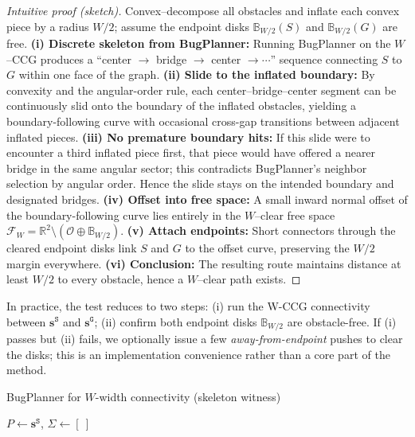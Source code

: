 \begin{proof}[Intuitive proof (sketch)]
Convex–decompose all obstacles and inflate each convex piece by a radius $W/2$; assume the endpoint disks $\mathbb{B}_{W/2}(S)$ and $\mathbb{B}_{W/2}(G)$ are free.
\textbf{(i) Discrete skeleton from BugPlanner:}
Running BugPlanner on the $W$–CCG produces a “center $\to$ bridge $\to$ center $\to \cdots$” sequence connecting $S$ to $G$ within one face of the graph.
\textbf{(ii) Slide to the inflated boundary:}
By convexity and the angular-order rule, each center–bridge–center segment can be continuously slid onto the boundary of the inflated obstacles, yielding a boundary-following curve with occasional cross-gap transitions between adjacent inflated pieces.
\textbf{(iii) No premature boundary hits:}
If this slide were to encounter a third inflated piece first, that piece would have offered a nearer bridge in the same angular sector; this contradicts BugPlanner’s neighbor selection by angular order. Hence the slide stays on the intended boundary and designated bridges.
\textbf{(iv) Offset into free space:}
A small inward normal offset of the boundary-following curve lies entirely in the $W$–clear free space $\mathcal{F}_W=\mathbb{R}^2\!\setminus(\mathcal{O}\oplus\mathbb{B}_{W/2})$.
\textbf{(v) Attach endpoints:}
Short connectors through the cleared endpoint disks link $S$ and $G$ to the offset curve, preserving the $W/2$ margin everywhere.
\textbf{(vi) Conclusion:}
The resulting route maintains distance at least $W/2$ to every obstacle, hence a $W$–clear path exists.
\end{proof}



\begin{remark}
In practice, the test reduces to two steps:
(i) run the W-CCG connectivity between $\mathbf{s}^{\texttt{S}}$ and $\mathbf{s}^{\texttt{G}}$;
(ii) confirm both endpoint disks $\mathbb{B}_{W/2}$ are obstacle-free.
If (i) passes but (ii) fails, we optionally issue a few \emph{away-from-endpoint} pushes to clear the disks; this is an implementation convenience rather than a core part of the method.
\end{remark}

\begin{algorithm}[t]
\small
\caption{BugPlanner for $W$-width connectivity (skeleton witness)}
\label{alg:bugplanner}
\DontPrintSemicolon
{}
$P\leftarrow\mathbf{s}^{\texttt{S}}$,\; $\Sigma\leftarrow[\ ]$\;
\end{algorithm}

